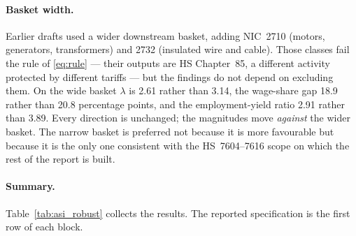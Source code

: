 \paragraph{Basket width.} Earlier drafts used a wider downstream basket, adding
NIC~2710 (motors, generators, transformers) and 2732 (insulated wire and cable).
Those classes fail the rule of \eqref{eq:rule} --- their outputs are HS Chapter~85, a
different activity protected by different tariffs --- but the findings do not depend on
excluding them. On the wide basket $\lambda$ is 2.61 rather than 3.14, the wage-share
gap 18.9 rather than 20.8 percentage points, and the employment-yield ratio 2.91
rather than 3.89. Every direction is unchanged; the magnitudes move \emph{against} the
wider basket. The narrow basket is preferred not because it is more favourable but
because it is the only one consistent with the HS~7604--7616 scope on which the rest of
the report is built.

\paragraph{Summary.} Table~\ref{tab:asi_robust} collects the results. The reported
specification is the first row of each block.

